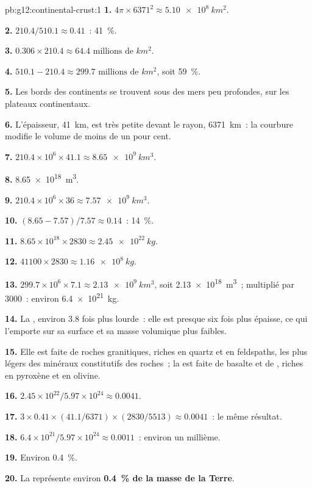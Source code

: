 \begin{solution}{pb:g12:continental-crust:1}
\textbf{1.} $4\pi \times 6371^2 \approx \qty{5.10e8}{km^2}$.

\textbf{2.} $210.4/510.1 \approx 0.41$~: \qty{41}{\percent}.

\textbf{3.} $0.306 \times 210.4 \approx \num{64.4}\text{ millions de }\unit{km^2}$.

\textbf{4.} $510.1 - 210.4 \approx \num{299.7}\text{ millions de }\unit{km^2}$,
soit \qty{59}{\percent}.

\textbf{5.} Les bords des continents se trouvent sous des mers peu
profondes, sur les plateaux continentaux.

\textbf{6.} L'épaisseur, \qty{41}{km}, est très petite devant le rayon,
\qty{6371}{km}~: la courbure modifie le volume de moins de un pour cent.

\textbf{7.} $210.4 \times 10^6 \times 41.1 \approx \qty{8.65e9}{km^3}$.

\textbf{8.} \qty{8.65e18}{m^3}.

\textbf{9.} $210.4 \times 10^6 \times 36 \approx \qty{7.57e9}{km^3}$.

\textbf{10.} $(8.65 - 7.57)/7.57 \approx 0.14$~: \qty{14}{\percent}.

\textbf{11.} $8.65 \times 10^{18} \times 2830 \approx \qty{2.45e22}{kg}$.

\textbf{12.} $41100 \times 2830 \approx \qty{1.16e8}{kg}$.

\textbf{13.} $299.7 \times 10^6 \times 7.1 \approx \qty{2.13e9}{km^3}$,
soit \qty{2.13e18}{m^3}~; multiplié par 3000~: environ \qty{6.4e21}{kg}.

\textbf{14.} La , environ 3.8 fois plus lourde~: elle est
presque six fois plus épaisse, ce qui l'emporte sur sa surface et sa masse
volumique plus faibles.

\textbf{15.} Elle est faite de roches granitiques, riches en quartz et en
feldspaths, les plus légers des minéraux constitutifs des roches~; la
 est faite de basalte et de , riches en pyroxène et
en olivine.

\textbf{16.} $2.45 \times 10^{22}/5.97 \times 10^{24} \approx 0.0041$.

\textbf{17.} $3 \times 0.41 \times (41.1/6371) \times (2830/5513) \approx
0.0041$~: le même résultat.

\textbf{18.} $6.4 \times 10^{21}/5.97 \times 10^{24} \approx 0.0011$~:
environ un millième.

\textbf{19.} Environ \qty{0.4}{\percent}.

\textbf{20.} La  représente environ
\textbf{\qty{0.4}{\percent} de la masse de la Terre}.
\end{solution}
